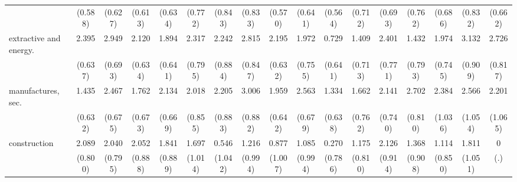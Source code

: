 {\begin{tabular}{l*{16}{c}}
                    &     (0.588)         &     (0.627)         &     (0.613)         &     (0.634)         &     (0.772)         &     (0.843)         &     (0.833)         &     (0.570)         &     (0.641)         &     (0.564)         &     (0.712)         &     (0.693)         &     (0.762)         &     (0.686)         &     (0.832)         &     (0.662)         \\
[1em]
extractive and energy.&       2.395\sym{***}&       2.949\sym{***}&       2.120\sym{***}&       1.894\sym{**} &       2.317\sym{**} &       2.242\sym{*}  &       2.815\sym{***}&       2.195\sym{***}&       1.972\sym{**} &       0.729         &       1.409\sym{*}  &       2.401\sym{**} &       1.432         &       1.974\sym{**} &       3.132\sym{***}&       2.726\sym{***}\\
                    &     (0.637)         &     (0.693)         &     (0.634)         &     (0.641)         &     (0.795)         &     (0.884)         &     (0.847)         &     (0.632)         &     (0.755)         &     (0.641)         &     (0.713)         &     (0.771)         &     (0.793)         &     (0.745)         &     (0.909)         &     (0.817)         \\
[1em]
manufactures, sec.  &       1.435\sym{*}  &       2.467\sym{***}&       1.762\sym{**} &       2.134\sym{**} &       2.018\sym{*}  &       2.205\sym{*}  &       3.006\sym{***}&       1.959\sym{**} &       2.563\sym{***}&       1.334\sym{*}  &       1.662\sym{*}  &       2.141\sym{**} &       2.702\sym{***}&       2.384\sym{*}  &       2.566\sym{*}  &       2.201\sym{*}  \\
                    &     (0.632)         &     (0.675)         &     (0.673)         &     (0.669)         &     (0.855)         &     (0.883)         &     (0.882)         &     (0.642)         &     (0.679)         &     (0.638)         &     (0.762)         &     (0.740)         &     (0.810)         &     (1.036)         &     (1.054)         &     (1.065)         \\
[1em]
construction        &       2.089\sym{**} &       2.040\sym{*}  &       2.052\sym{*}  &       1.841\sym{*}  &       1.697         &       0.546         &       1.216         &       0.877         &       1.085         &       0.270         &       1.175         &       2.126\sym{*}  &       1.368         &       1.114         &       1.811         &           0         \\
                    &     (0.800)         &     (0.795)         &     (0.888)         &     (0.889)         &     (1.014)         &     (1.042)         &     (0.994)         &     (1.007)         &     (0.994)         &     (0.786)         &     (0.810)         &     (0.914)         &     (0.908)         &     (0.850)         &     (1.051)         &         (.)         \\

\end{tabular}}
